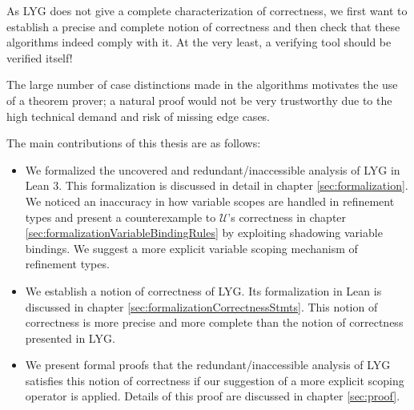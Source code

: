 As LYG does not give a complete characterization of correctness,
we first want to establish a precise and complete notion of correctness and then check that these algorithms indeed comply with it. At the very least, a verifying tool should be verified itself!

The large number of case distinctions made in the algorithms motivates the use of a theorem prover;
a natural proof would not be very trustworthy due to the high technical demand and risk of missing edge cases.

\vspace{\baselineskip}

The main contributions of this thesis are as follows:
\begin{itemize}
\item We formalized the uncovered and redundant/inaccessible analysis of LYG in Lean 3. This formalization is discussed in detail in chapter \ref{sec:formalization}.
We noticed an inaccuracy in how variable scopes are handled in refinement types
and present a counterexample to $\mathcal{U}$'s correctness in chapter \ref{sec:formalizationVariableBindingRules} by exploiting shadowing variable bindings.
We suggest a more explicit variable scoping mechanism of refinement types.
\item We establish a notion of correctness of LYG. Its formalization in Lean is discussed in chapter \ref{sec:formalizationCorrectnessStmts}. This notion of correctness is more precise and more complete than the notion of correctness presented in LYG.
\item We present formal proofs that the redundant/inaccessible analysis of LYG satisfies
    this notion of correctness if our suggestion of a more explicit scoping operator is applied. Details of this proof are discussed in chapter \ref{sec:proof}.

\end{itemize}